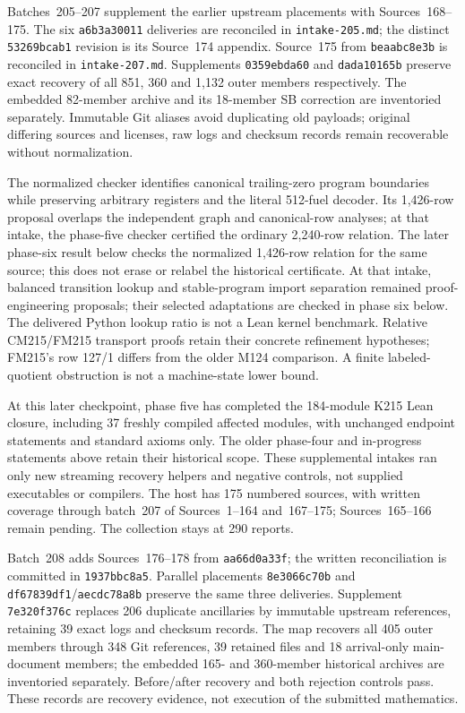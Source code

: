 \documentclass[11pt]{article}
\begin{document}
{Batches~205--207 supplement the earlier upstream placements with Sources~168--175.
The six \texttt{a6b3a30011} deliveries are reconciled in \texttt{intake-205.md};
the distinct \texttt{53269bcab1} revision is its Source~174 appendix.
Source~175 from \texttt{beaabc8e3b} is reconciled in \texttt{intake-207.md}.
Supplements \texttt{0359ebda60} and \texttt{dada10165b} preserve exact recovery
of all 851, 360 and 1,132 outer members respectively. The embedded 82-member
archive and its 18-member SB correction are inventoried separately. Immutable
Git aliases avoid duplicating old payloads; original differing sources and
licenses, raw logs and checksum records remain recoverable without normalization.

The normalized checker identifies canonical trailing-zero program boundaries
while preserving arbitrary registers and the literal 512-fuel decoder. Its
1,426-row proposal overlaps the independent graph and canonical-row analyses;
at that intake, the phase-five checker certified the ordinary 2,240-row relation.
The later phase-six result below checks the normalized 1,426-row relation for the
same source; this does not erase or relabel the historical certificate.
At that intake, balanced transition lookup and stable-program import separation
remained proof-engineering proposals; their selected adaptations are checked in
phase six below. The delivered
Python lookup ratio is not a Lean kernel benchmark. Relative CM215/FM215
transport proofs retain their concrete refinement hypotheses; FM215's row
127/1 differs from the older M124 comparison. A finite labeled-quotient
obstruction is not a machine-state lower bound.

At this later checkpoint, phase five has completed the 184-module K215 Lean
closure, including 37 freshly compiled affected modules, with unchanged
endpoint statements and standard axioms only. The older phase-four and
in-progress statements above retain their historical scope. These supplemental
intakes ran only new streaming recovery helpers and negative controls, not
supplied executables or compilers. The host has 175 numbered sources, with
written coverage through batch~207 of Sources~1--164 and~167--175;
Sources~165--166 remain pending. The collection stays at 290 reports.

Batch~208 adds Sources~176--178 from \texttt{aa66d0a33f}; the written
reconciliation is committed in \texttt{1937bbc8a5}. Parallel placements
\texttt{8e3066c70b} and \texttt{df67839df1}/\texttt{aecdc78a8b} preserve the
same three deliveries. Supplement \texttt{7e320f376c} replaces 206 duplicate
ancillaries by immutable upstream references, retaining 39 exact logs and
checksum records. The map recovers all 405 outer members through 348 Git
references, 39 retained files and 18 arrival-only main-document members;
the embedded 165- and 360-member historical archives are inventoried separately.
Before/after recovery and both rejection controls pass. These records are
recovery evidence, not execution of the submitted mathematics.

}
\end{document}
